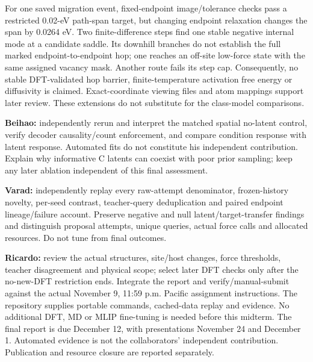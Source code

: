 \documentclass[10pt]{article}
\begin{document}
For one saved migration event, fixed-endpoint image/tolerance checks pass a
restricted 0.02-eV path-span target, but changing endpoint relaxation changes
the span by 0.0264 eV. Two finite-difference steps find one stable negative
internal mode at a candidate saddle. Its downhill branches do not establish the
full marked endpoint-to-endpoint hop; one reaches an off-site low-force state
with the same assigned vacancy mask. Another route fails its step cap.
Consequently, no stable DFT-validated hop barrier, finite-temperature activation
free energy or diffusivity is claimed. Exact-coordinate viewing files and atom
mappings support later review. These extensions do not substitute for the
class-model comparisons.

\textbf{Beihao:} independently rerun and interpret the matched spatial no-latent
control, verify decoder causality/count enforcement, and compare condition
response with latent response. Automated fits do not constitute his independent
contribution. Explain why informative C latents can coexist with poor prior
sampling; keep any later ablation independent of this final assessment.

\textbf{Varad:} independently replay every raw-attempt denominator, frozen-history
novelty, per-seed contrast, teacher-query deduplication and paired endpoint
lineage/failure account. Preserve negative and null latent/target-transfer findings
and distinguish proposal attempts, unique queries, actual force calls and
allocated resources. Do not tune from final outcomes.

\textbf{Ricardo:} review the actual structures, site/host changes, force thresholds,
teacher disagreement and physical scope; select later DFT checks only after
the no-new-DFT restriction ends. Integrate the report and verify/manual-submit
against the actual November 9, 11:59 p.m. Pacific assignment instructions.
The repository supplies portable commands, cached-data replay and evidence.
No additional DFT, MD or MLIP fine-tuning is needed before this midterm.
The final report is due December 12, with presentations November 24 and
December 1. Automated evidence is not the collaborators' independent
contribution. Publication and resource closure are reported separately.

\clearpage
\end{document}
